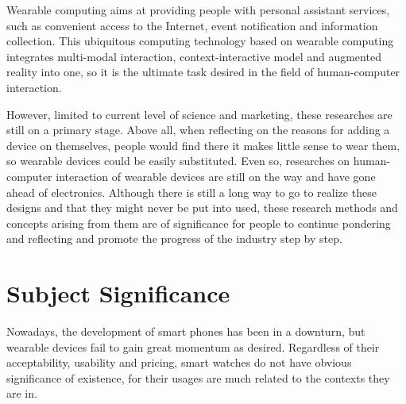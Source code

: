 Wearable computing aims at providing people with personal assistant services, such as convenient access to the Internet, event notification and information collection. This ubiquitous computing technology based on wearable computing integrates multi-modal interaction, context-interactive model and augmented reality into one, so it is the ultimate task desired in the field of human-computer interaction\cite{dongshihai2004,yuweining2004}.

However, limited to current level of science and marketing, these researches are still on a primary stage. Above all, when reflecting on the reasons for adding a device on themselves, people would find there it makes little sense to wear them, so wearable devices could be easily substituted. Even so, researches on human-computer interaction of wearable devices are still on the way and have gone ahead of electronics. Although there is still a long way to go to realize these designs and that they might never be put into used, these research methods and concepts arising from them are of significance for people to continue pondering\cite{hudson2014concepts} and reflecting and promote the progress of the industry step by step.

\section{Subject Significance}

Nowadays, the development of smart phones has been in a downturn, but wearable devices fail to gain great momentum as desired. Regardless of their acceptability, usability and pricing, smart watches do not have obvious significance of existence, for their usages are much related to the contexts they are in.

